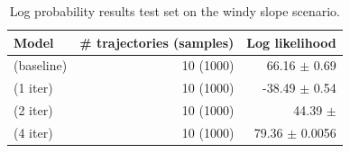 \begin{table}
\centering
\begin{tabular}{lrr}
\toprule
Model & \# trajectories (samples) & Log likelihood  \\
\midrule
\cvae{} (baseline) & 10 (1000) & 66.16 $\pm$ 0.69\\


\dettostoc{} (1 iter) & 10 (1000) & -38.49 $\pm$ 0.54 \\
\dettostoc{} (2 iter) & 10 (1000) & 44.39 $\pm$  \\
\dettostoc{} (4 iter) & 10 (1000) & 79.36 $\pm$ 0.0056 \\
\bottomrule
\end{tabular}
\caption{Log probability results test set on the windy slope scenario.}
\label{fig:windyslope_logprob}
\end{table}

